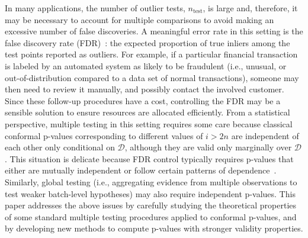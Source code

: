 \documentclass[11pt]{article}
\begin{document}
In many applications, the number of outlier tests, $n_{\text{test}}$, is large and, therefore, it may be necessary to account for multiple comparisons to avoid making an excessive number of false discoveries.
A meaningful error rate in this setting is the false discovery rate (FDR)~\cite{benjamini1995controlling}: the expected proportion of true inliers among the test points reported as outliers. For example, if a particular financial transaction is labeled by an automated system as likely to be fraudulent (i.e., unusual, or out-of-distribution compared to a data set of normal transactions), someone may then need to review it manually, and possibly contact the involved customer.
Since these follow-up procedures have a cost, controlling the FDR may be a sensible solution to ensure resources are allocated efficiently.
From a statistical perspective, multiple testing in this setting requires some care because classical conformal p-values corresponding to different values of $i>2n$ are independent of each other only conditional on $\mathcal{D}$, although they are valid only marginally over $\mathcal{D}$.
This situation is delicate because FDR control typically requires p-values that either are mutually independent or follow certain patterns of dependence~\cite{benjamini2001control, clarke2009robustness}.
Similarly, global testing (i.e., aggregating evidence from multiple observations to test weaker batch-level hypotheses) may also require independent p-values.
This paper addresses the above issues by carefully studying the theoretical properties of some standard multiple testing procedures applied to conformal p-values, and by developing new methods to compute p-values with stronger validity properties.
\end{document}
